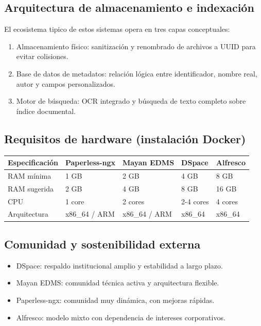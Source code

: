 \subsection{Arquitectura de almacenamiento e indexación}
El ecosistema tipico de estos sistemas opera en tres capas conceptuales:

\begin{enumerate}
  \item Almacenamiento físico: sanitización y renombrado de archivos a UUID para evitar colisiones.
  \item Base de datos de metadatos: relación lógica entre identificador, nombre real, autor y campos personalizados.
  \item Motor de búsqueda: OCR integrado y búsqueda de texto completo sobre índice documental.
\end{enumerate}

\subsection{Requisitos de hardware (instalación Docker)}
\begin{longtable}{p{} p{} p{} p{} p{}}
\toprule
\textbf{Especificación} & \textbf{Paperless-ngx} & \textbf{Mayan EDMS} & \textbf{DSpace} & \textbf{Alfresco} \\
\midrule
RAM mínima & 1 GB & 2 GB & 4 GB & 8 GB \\
RAM sugerida & 2 GB & 4 GB & 8 GB & 16 GB \\
CPU & 1 core & 2 cores & 2-4 cores & 4 cores \\
Arquitectura & x86\_64 / ARM & x86\_64 / ARM & x86\_64 & x86\_64 \\
\bottomrule
\end{longtable}

\subsection{Comunidad y sostenibilidad externa}
\begin{itemize}
  \item DSpace: respaldo institucional amplio y estabilidad a largo plazo.
  \item Mayan EDMS: comunidad técnica activa y arquitectura flexible.
  \item Paperless-ngx: comunidad muy dinámica, con mejoras rápidas.
  \item Alfresco: modelo mixto con dependencia de intereses corporativos.
\end{itemize}

